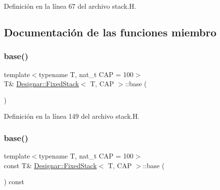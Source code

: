 Definición en la línea 67 del archivo stack.\+H.



\subsection{Documentación de las funciones miembro}
\mbox{\label{class_designar_1_1_fixed_stack_a01f5207d31f8bbad380ea6923a0bbb80}} 
\subsubsection{\texorpdfstring{base()}{base()}\hspace{0.1cm}{\footnotesize\ttfamily [1/2]}}
{\footnotesize\ttfamily template$<$typename T, nat\+\_\+t C\+AP = 100$>$ \\
T\& \hyperlink{class_designar_1_1_fixed_stack}{Designar\+::\+Fixed\+Stack}$<$ T, C\+AP $>$\+::base (\begin{DoxyParamCaption}{ }\end{DoxyParamCaption})\hspace{0.3cm}{\ttfamily [inline]}}



Definición en la línea 149 del archivo stack.\+H.

\mbox{\label{class_designar_1_1_fixed_stack_a27e6b0668b52af53a224a0e8fcd4b719}} 
\subsubsection{\texorpdfstring{base()}{base()}\hspace{0.1cm}{\footnotesize\ttfamily [2/2]}}
{\footnotesize\ttfamily template$<$typename T, nat\+\_\+t C\+AP = 100$>$ \\
const T\& \hyperlink{class_designar_1_1_fixed_stack}{Designar\+::\+Fixed\+Stack}$<$ T, C\+AP $>$\+::base (\begin{DoxyParamCaption}{ }\end{DoxyParamCaption}) const\hspace{0.3cm}{\ttfamily [inline]}}



